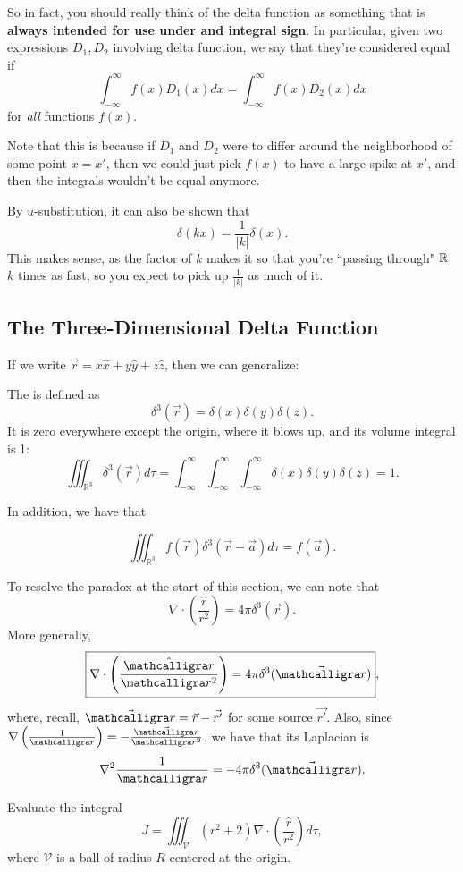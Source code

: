 So in fact, you should really think of the delta function as something that is \textbf{always intended for use under and integral sign}. In particular, given two expressions $D_1, D_2$ involving delta function, we say that they're considered equal if
\[\int_{-\infty}^\infty f(x)D_1(x)dx=\int_{-\infty}^\infty f(x)D_2(x)dx\]
for \textit{all} functions $f(x)$.

Note that this is because if $D_1$ and $D_2$ were to differ around the neighborhood of some point $x=x'$, then we could just pick $f(x)$ to have a large spike at $x'$, and then the integrals wouldn't be equal anymore.

By $u$-substitution, it can also be shown that
\[\delta(kx)=\frac{1}{|k|}\delta(x).\]
This makes sense, as the factor of $k$ makes it so that you're ``passing through" $\mathbb R$ $k$ times as fast, so you expect to pick up $\frac{1}{|k|}$ as much of it.

\subsection{The Three-Dimensional Delta Function}\label{3ddirac}

If we write $\vec{r}=x\hat{x}+y\hat{y}+z\hat{z}$, then we can generalize:

\begin{definition}
    The  is defined as
    \[\delta^3(\vec{r})=\delta(x)\delta(y)\delta(z).\]
    It is zero everywhere except the origin, where it blows up, and its volume integral is 1:
    \[\iiint_{\mathbb{R}^3}\delta^3(\vec{r})d\tau=\int_{-\infty}^\infty\int_{-\infty}^\infty\int_{-\infty}^\infty\delta(x)\delta(y)\delta(z)=1.\]
\end{definition}

In addition, we have that

\[\boxed{\iiint_{\mathbb{R}^3}f(\vec{r})\delta^3(\vec{r}-\vec{a})d\tau=f(\vec{a})}.\]

To resolve the paradox at the start of this section, we can note that
\[\nabla\cdot\left(\frac{\hat{r}}{r^2}\right)=4\pi\delta^3(\vec{r}).\]
More generally,
\[\boxed{\nabla\cdot\left(\frac{\hat{\scr}}{\scr^2}\right)=4\pi\delta^3(\vec{\scr})},\]
where, recall, $\vec{\scr}=\vec{r}-\vec{r'}$ for some source $\vec{r'}$. Also, since $\nabla\left(\frac{1}{\scr}\right)=-\frac{\vec{\scr}}{\scr^2}$, we have that its Laplacian is
\[\nabla^2\frac{1}{\scr}=-4\pi\delta^3(\vec{\scr}).\]

\begin{example}
Evaluate the integral
\[J=\iiint_{\mathcal{V}}(r^2+2)\nabla\cdot\left(\frac{\hat{r}}{r^2}\right)d\tau,\]
where $\mathcal{V}$ is a ball of radius $R$ centered at the origin.
\end{example}

